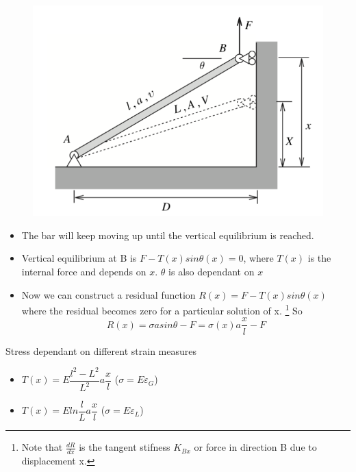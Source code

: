 	\begin{frame}
		\begin{figure}
			\centering
			\includegraphics[width=0.3\linewidth]{Figure/fig4}
			\label{fig:fig1}
		\end{figure}
		\begin{itemize}
		\item The bar will keep moving up until the vertical equilibrium is reached.
		\item Vertical equilibrium at B is $F - T(x)sin \theta(x) = 0$, where $T(x)$ is the internal force and depends on $x$. $\theta$ is also dependant on $x$
		\item Now we can construct a residual function $R(x) =  F - T(x)sin \theta(x)$ where the residual becomes zero for a particular solution of x. \footnote{Note that $\frac{d R}{d x}$ is the tangent stifness $K_{Bx}$ or force in direction B due to displacement x.}  So
		\begin{equation}
		R(x) = \sigma a sin \theta - F = \sigma(x) a \frac{ x}{l} - F
		\end{equation} 	
		\end{itemize}
		
		\begin{block}{Stress dependant on different strain measures}
			\begin{itemize}
				\item $T(x) = E \dfrac{l^2-L^2}{L^2} a \dfrac{x}{l}$  \hfill ($\sigma =  E \varepsilon_G$)
				\item $T(x) = E ln\dfrac{l}{L} a \dfrac{x}{l}$ \hfill	($\sigma =  E \varepsilon_L$)			
			\end{itemize}
		\end{block}
	\end{frame}

